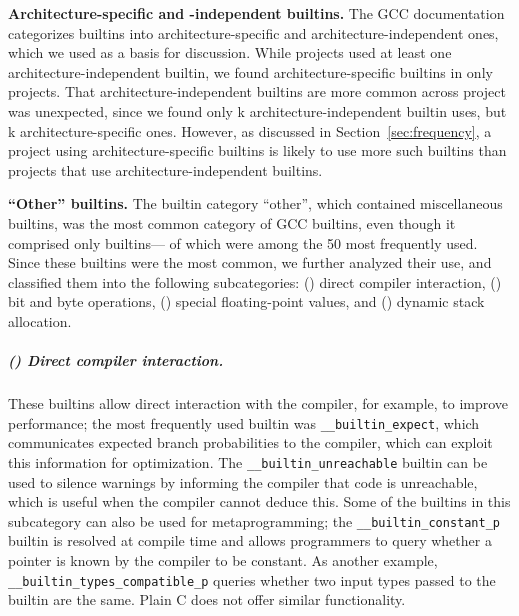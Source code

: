 \documentclass[sigconf,screen]{acmart}
\renewcommand{\paragraph}[1]{\textbf{#1}}
\newcommand\code[1]{\texttt{#1}}
\newcommand{\RNum}[1]{\uppercase\expandafter{\romannumeral #1\relax}}
\begin{document}
\paragraph{Architecture-specific and -independent builtins.}
The GCC documentation categorizes builtins into architecture-specific and architecture-independent ones, which we used as a basis for discussion.
While \nrProjectsWithMachineIndependentBuiltins{} projects used at least one architecture-independent builtin, we found architecture-specific builtins in only \nrProjectsWithMachineSpecificBuiltins{} projects.
That architecture-independent builtins are more common across project was unexpected, since we found only \kMachineIndependentBuiltinsTotal{}k architecture-independent builtin uses, but \kMachineSpecificBuiltinsTotal{}k architecture-specific ones.
However, as discussed in Section~\ref{sec:frequency}, a project using architecture-specific builtins is likely to use more such builtins than projects that use architecture-in\-de\-pen\-dent builtins.

\paragraph{``Other'' builtins.}
The builtin category ``other'', which contained miscellaneous builtins, was the most common category of GCC builtins, even though it comprised only \nrOtherBuiltins{} builtins---\topOtherBuiltins{} of which were among the 50 most frequently used.
Since these builtins were the most common, we further analyzed their use, and classified them into the following subcategories: (\RNum{1}) direct compiler interaction, (\RNum{2}) bit and byte operations, (\RNum{3}) special floating-point values, and (\RNum{4}) dynamic stack allocation. %

\subparagraph{(\RNum{1}) Direct compiler interaction.}
\sloppy
These builtins allow direct interaction with the compiler, for example, to improve performance; the most frequently used builtin was \code{\_\_builtin\_expect}, which communicates expected branch probabilities to the compiler, which can exploit this information for optimization.
The \code{\_\_builtin\_unreachable} builtin can be used to silence warnings by informing the compiler that code is unreachable, which is useful when the compiler cannot deduce this.
Some of the builtins in this subcategory can also be used for metaprogramming; the \code{\_\_builtin\_constant\_p} builtin is resolved at compile time and allows programmers to query whether a pointer is known by the compiler to be constant.
As another example, \code{\_\_builtin\_types\_compatible\_p} queries whether two input types passed to the builtin are the same.
Plain C does not offer similar functionality.
\end{document}
